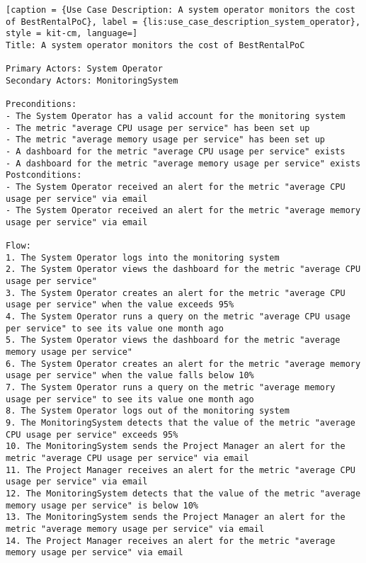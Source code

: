 \vspace{0.5cm}
\begin{lstlisting}[caption = {Use Case Description: A system operator monitors the cost of BestRentalPoC}, label = {lis:use_case_description_system_operator}, style = kit-cm, language=] 
Title: A system operator monitors the cost of BestRentalPoC

Primary Actors: System Operator
Secondary Actors: MonitoringSystem

Preconditions:
- The System Operator has a valid account for the monitoring system
- The metric "average CPU usage per service" has been set up
- The metric "average memory usage per service" has been set up
- A dashboard for the metric "average CPU usage per service" exists
- A dashboard for the metric "average memory usage per service" exists
Postconditions:
- The System Operator received an alert for the metric "average CPU usage per service" via email
- The System Operator received an alert for the metric "average memory usage per service" via email

Flow:
1. The System Operator logs into the monitoring system
2. The System Operator views the dashboard for the metric "average CPU usage per service"
3. The System Operator creates an alert for the metric "average CPU usage per service" when the value exceeds 95%
4. The System Operator runs a query on the metric "average CPU usage per service" to see its value one month ago
5. The System Operator views the dashboard for the metric "average memory usage per service"
6. The System Operator creates an alert for the metric "average memory usage per service" when the value falls below 10%
7. The System Operator runs a query on the metric "average memory usage per service" to see its value one month ago
8. The System Operator logs out of the monitoring system
9. The MonitoringSystem detects that the value of the metric "average CPU usage per service" exceeds 95%
10. The MonitoringSystem sends the Project Manager an alert for the metric "average CPU usage per service" via email
11. The Project Manager receives an alert for the metric "average CPU usage per service" via email
12. The MonitoringSystem detects that the value of the metric "average memory usage per service" is below 10%
13. The MonitoringSystem sends the Project Manager an alert for the metric "average memory usage per service" via email
14. The Project Manager receives an alert for the metric "average memory usage per service" via email


\end{lstlisting}
